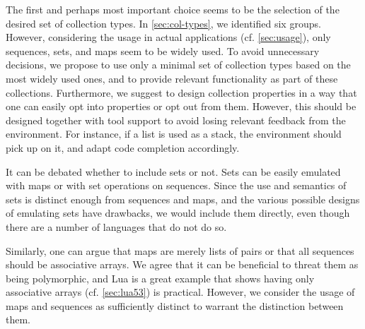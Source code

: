 \documentclass[sigconf, 10pt]{acmart}
\begin{document}
The first and perhaps most important choice seems to be the selection of the
desired set of collection types.
In \cref{sec:col-types}, we identified six groups.
However, considering the usage in actual applications (cf. \cref{sec:usage}),
only sequences, sets, and maps seem to be widely used.
To avoid unnecessary decisions,
we propose to use only a minimal set of collection types
based on the most widely used ones,
and to provide relevant functionality as part of these collections.
Furthermore, we suggest to design collection properties
in a way that one can easily opt into properties or opt out from them.
However, this should be designed together with tool support
to avoid losing relevant feedback from the environment.
For instance, if a list is used as a stack,
the environment should pick up on it,
and adapt code completion accordingly.

It can be debated whether to include sets or not.
Sets can be easily emulated with maps
 or with set operations on sequences.
Since the use and semantics of sets is distinct enough from sequences and maps,
and the various possible designs of emulating sets have drawbacks,
we would %
include them directly,
even though there are a number of languages that do not do so.

Similarly, one can argue that maps are merely lists of pairs
or that all sequences should be associative arrays.
We agree that it can be beneficial to threat them as being polymorphic,
and Lua is a great example that shows having only associative arrays
(cf. \cref{sec:lua53}) is practical.
However, we consider the usage of maps and sequences
as sufficiently distinct to warrant
the distinction between them. 
\end{document}

